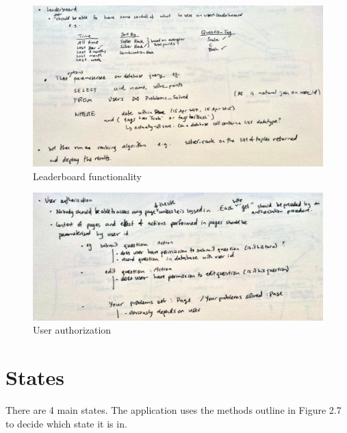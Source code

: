 \documentclass{report}
\begin{document}
\begin{figure}[H]
\includegraphics[width=\textwidth]{leaderboard}
\caption{Leaderboard functionality}
\end{figure}

\begin{figure}[H]
\includegraphics[width=\textwidth]{authorization}
\caption{User authorization}
\end{figure}

\section{States}
There are 4 main states. The application uses the methods outline in Figure 2.7 to decide which state it is in.
\end{document}
